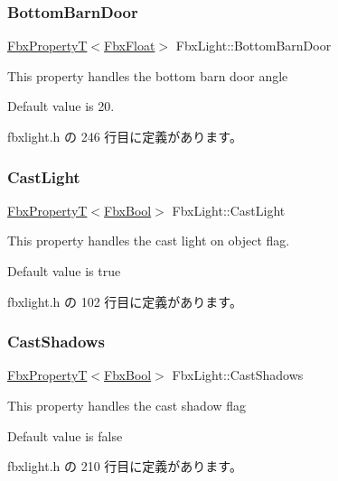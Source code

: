 \subsubsection{\texorpdfstring{Bottom\+Barn\+Door}{BottomBarnDoor}}
{\footnotesize\ttfamily \hyperlink{class_fbx_property_t}{Fbx\+PropertyT}$<$\hyperlink{fbxtypes_8h_aef968e37f2ddc4188de464d8578c1d5c}{Fbx\+Float}$>$ Fbx\+Light\+::\+Bottom\+Barn\+Door}

This property handles the bottom barn door angle

Default value is 20. 

 fbxlight.\+h の 246 行目に定義があります。

\mbox{\label{class_fbx_light_aab7e8386257e02ef8e3873f15d5fc690}} 
\subsubsection{\texorpdfstring{Cast\+Light}{CastLight}}
{\footnotesize\ttfamily \hyperlink{class_fbx_property_t}{Fbx\+PropertyT}$<$\hyperlink{fbxtypes_8h_a92e0562b2fe33e76a242f498b362262e}{Fbx\+Bool}$>$ Fbx\+Light\+::\+Cast\+Light}

This property handles the cast light on object flag.

Default value is true 

 fbxlight.\+h の 102 行目に定義があります。

\mbox{\label{class_fbx_light_a9ab7648e8c96d34f4feb5c76c52987ce}} 
\subsubsection{\texorpdfstring{Cast\+Shadows}{CastShadows}}
{\footnotesize\ttfamily \hyperlink{class_fbx_property_t}{Fbx\+PropertyT}$<$\hyperlink{fbxtypes_8h_a92e0562b2fe33e76a242f498b362262e}{Fbx\+Bool}$>$ Fbx\+Light\+::\+Cast\+Shadows}

This property handles the cast shadow flag

Default value is false 

 fbxlight.\+h の 210 行目に定義があります。

\mbox{\label{class_fbx_light_abd8989416ecbe6a33adcb6bc09b2401b}} 
